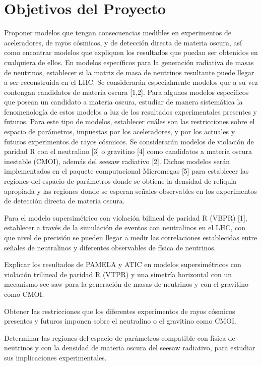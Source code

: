 \section{Objetivos del Proyecto }
Proponer modelos que tengan consecuencias medibles en experimentos de aceleradores, de rayos cósmicos, y de detección directa de materia oscura, así como encontrar modelos que expliquen los resultados que puedan ser obtenidos en cualquiera de ellos. En modelos específicos para la generación radiativa de masas de neutrinos, establecer si la matriz de masa de neutrinos resultante puede llegar a ser reconstruida en el LHC. Se considerarán especialmente modelos que a su vez contengan candidatos de materia oscura [1,2]. Para algunos modelos específicos que posean un candidato a materia oscura, estudiar de manera sistemática la fenomenología de estos modelos a luz de los resultados experimentales presentes y futuros. Para este tipo de modelos, establecer cuáles son las restricciones sobre el espacio de parámetros, impuestas por los aceleradores, y por los actuales y futuros experimentos de rayos cósmicos. Se considerarán modelos de violación de paridad R con el neutralino [3] o gravitino [4] como candidatos a materia oscura inestable (CMOI), además del seesaw radiativo [2]. Dichos modelos serán implementados en el paquete computacional Micromegas [5] para establecer las regiones del espacio de parámetros donde se obtiene la densidad de reliquia apropiada y las regiones donde se esperan señales observables en los experimentos de detección directa de materia oscura. 


Para el modelo supersimétrico con violación bilineal de paridad R (VBPR) [1],  establecer a través de la simulación de eventos con neutralinos en el LHC, con que nivel de precisión se pueden llegar a medir las correlaciones establecidas entre señales de neutralinos y diferentes observables de física de neutrinos.

Explicar los resultados de PAMELA y ATIC en modelos supersimétricos con violación trilineal de paridad R (VTPR) y una simetría horizontal con un mecanismo see-saw para la generación de masas de neutrinos y con el gravitino como CMOI.

Obtener las restricciones que los diferentes experimentos de rayos cósmicos presentes y futuros imponen sobre el neutralino o el gravitino como CMOI.

Determinar las regiones del espacio de parámetros compatible con física de neutrinos y con la densidad de materia oscura del seesaw radiativo, para estudiar sus implicaciones experimentales.

